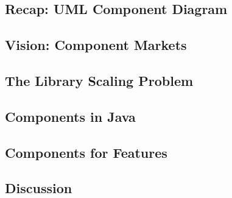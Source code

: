 
\subsection{Recap: UML Component Diagram}
\subsection{Vision: Component Markets}
\subsection{The Library Scaling Problem}
\subsection{Components in Java}
\subsection{Components for Features}
\subsection{Discussion}

